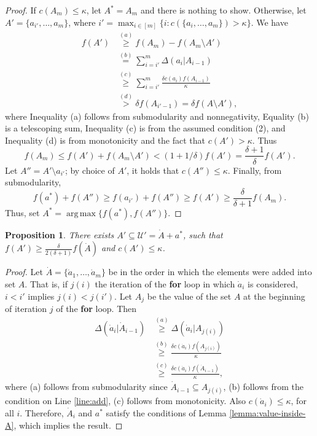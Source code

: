 \documentclass{article}
\newtheorem{proposition}{Proposition}
\theoremstyle{definition}
\newcommand{\uni}{\mathcal{U}}
\newcommand{\marge}[2]{ \Delta \left( #1 | #2 \right) }
\DeclareMathOperator*{\argmax}{arg\,max}
\begin{document}
\begin{proof}
  If $c(A_m) \le \kappa$, let $A^* = A_m$ and there is nothing to show.
  Otherwise, let $A' =  \{a_{i'}, \ldots, a_m \}$, where $i' = \max_{i \in [m]} \{ i: c( \{ a_i, \ldots, a_m \} ) > \kappa \}$.
  We have
  \begin{align*}
    f(A') &\overset{(a)}{\ge} f(A_m) - f( A_m \setminus A') \\
          &\overset{(b)}{=} \sum_{i=i'}^m \marge{ a_i }{ A_{i-1} } \\
          &\overset{(c)}{\ge} \sum_{i=i'}^m \frac{ \delta c(a_i) f( A_{i-1} )}{\kappa} \\
          &\overset{(d)}{>} \delta f(A_{i'-1} ) = \delta f( A \setminus A' ),
  \end{align*}
  where Inequality (a) follows from submodularity and nonnegativity, Equality (b)
  is a telescoping sum, Inequality (c) is from the assumed condition (2), and Inequality
  (d) is from monotonicity and the fact that $c( A' ) > \kappa$.
  Thus
  $$ f(A_m) \le f(A') + f( A_m \setminus A') < (1 + 1/\delta) f(A') = \frac{\delta +1}{\delta } f(A').$$
  Let $A'' = A' \setminus a_{i'}$; by choice of $A'$, it holds that $c(A'') \le \kappa$.
  Finally, from submodularity, $$f( a^* ) + f(A'') \ge f(a_{i'}) + f(A'') \ge f(A') \ge \frac{\delta}{\delta + 1} f(A_m).$$
  Thus, set $A^* = \argmax \{ f( a^* ), f(A'') \}$. 
\end{proof}
\begin{proposition} \label{prop:aprime}
  There exists $A' \subseteq \uni' = \dot A + a^*$, such that  $f(A') \ge \frac{\delta}{2(\delta + 1)} f(\dot A )$
  and $c(A') \le \kappa$. 
\end{proposition}
\begin{proof}
  Let $\dot A = \{\dot a_1, \ldots, \dot a_m \}$ be in the order in which the elements were added into set $A$.
  That is, if $j(i)$ the iteration of the \textbf{for} loop in which $\dot a_i$ is considered, $i < i'$ implies
  $j(i) < j(i')$. Let $A_j$ be the value of the set $A$ at the beginning of iteration $j$ of the \textbf{for}
  loop.
  Then
  \begin{align*}
    \marge{ \dot a_i }{ \dot A_{i-1} } &\overset{(a)}{\ge} \marge{ \dot a_i }{ A_{j(i)} } \\
                                       &\overset{(b)}{\ge} \frac{ \delta c( \dot a_i ) f( A_{j(i)} )}{\kappa} \\
                                       &\overset{(c)}{\ge} \frac{ \delta c( \dot a_i ) f( \dot A_{i - 1} )}{\kappa},
  \end{align*}
  where (a) follows from submodularity since $\dot A_{i-1} \subseteq A_{j(i)}$,
  (b) follows from the condition on Line \ref{line:add},
  (c) follows from monotonicity. 
  Also $c(\dot a_i ) \le \kappa$, for all $i$. Therefore, $\dot A_i$ and $a^*$ satisfy the conditions of
  Lemma \ref{lemma:value-inside-A}, which implies the result. 
\end{proof}
\end{document}

